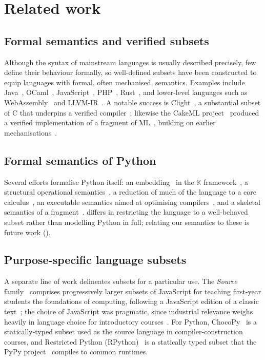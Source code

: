 \section{Related work}
\label{sec:related-work}

\subsection{Formal semantics and verified subsets}

Although the syntax of mainstream languages is usually described precisely, few define their behaviour
formally, so well-defined subsets have been constructed to equip languages with formal, often mechanised,
semantics. Examples include Java~\citep{igarashi2001}, OCaml~\citep{seassau2025},
JavaScript~\citep{bodin2014,guha2010,park2015,politz2012}, PHP~\citep{filaretti2014},
Rust~\citep{jung2020,jung2018}, and lower-level languages such as WebAssembly~\citep{watt2021a,watt2021,watt2023}
and LLVM-IR~\citep{zakowski2021,zhao2012}. A notable success is Clight~\citep{blazy2009}, a substantial subset of
C that underpins a verified compiler~\citep{leroy2009}; likewise the CakeML project~\citep{kumar2014} produced a
verified implementation of a fragment of ML~\citep{milner1997}, building on earlier mechanisations~\citep{lee2007}.

\subsection{Formal semantics of Python}

Several efforts formalise Python itself: an embedding~\citep{guth2013} in the $\mathbb{K}$
framework~\citep{rosu2010}, a structural operational semantics~\citep{kohl2021}, a reduction of much of the
language to a core calculus~\citep{politz2013}, an executable semantics aimed at optimising
compilers~\citep{melancon2023}, and a skeletal semantics of a fragment~\citep{andrieux}. \PurePy differs in
restricting the language to a well-behaved subset rather than modelling Python in full; relating our semantics
to these is future work ().

\subsection{Purpose-specific language subsets}

A separate line of work delineates subsets for a particular use. The \emph{Source} family~\citep{anderson2021}
comprises progressively larger subsets of JavaScript for teaching first-year students the foundations of
computing, following a JavaScript edition of a classic text~\citep{abelson2022}; the choice of JavaScript was
pragmatic, since industrial relevance weighs heavily in language choice for introductory
courses~\citep{simon2018}. For Python, ChocoPy~\citep{padhye2019} is a statically-typed subset used as the source
language in compiler-construction courses, and Restricted Python (RPython)~\citep{ancona2007} is a statically
typed subset that the PyPy project~\citep{rigo2006} compiles to common runtimes.

